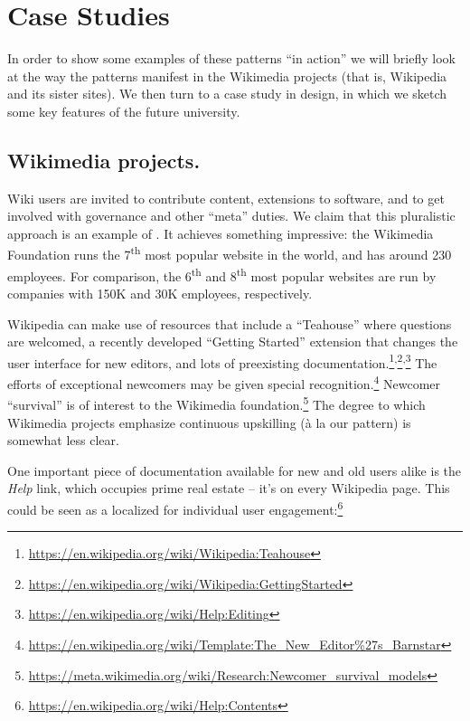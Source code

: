 \section{Case Studies}\label{sec:Case Studies}

In order to show some examples of these patterns ``in action'' we will
briefly look at the way the patterns manifest in the Wikimedia
projects (that is, Wikipedia and its sister sites).  We then turn to a
case study in design, in which we sketch some key features of the
future university.

\subsection{Wikimedia projects.}

Wiki users are invited to contribute content, extensions to software,
and to get involved with governance and other ``meta'' duties.  We
claim that this pluralistic approach is an example of
.  It achieves something
impressive: the Wikimedia Foundation runs the 7\textsuperscript{th}
most popular website in the world, and has around 230 employees.  For
comparison, the 6\textsuperscript{th} and 8\textsuperscript{th} most
popular websites are run by companies with 150K and 30K employees,
respectively.

Wikipedia  can make use of resources that
include a ``Teahouse'' where questions are welcomed, a recently
developed ``Getting Started'' extension that changes the user
interface for new editors, and lots of preexisting
documentation.\footnote{\url{https://en.wikipedia.org/wiki/Wikipedia:Teahouse}}\textsuperscript{,}\footnote{\url{https://en.wikipedia.org/wiki/Wikipedia:GettingStarted}}\textsuperscript{,}\footnote{\url{https://en.wikipedia.org/wiki/Help:Editing}}
The efforts of exceptional newcomers may be given special
recognition.\footnote{\url{https://en.wikipedia.org/wiki/Template:The_New_Editor\%27s_Barnstar}}
Newcomer ``survival'' is of interest to the Wikimedia
foundation.\footnote{\url{https://meta.wikimedia.org/wiki/Research:Newcomer_survival_models}}
The degree to which Wikimedia projects emphasize continuous upskilling
(\`a la our  pattern) is somewhat less clear.

One important piece of documentation available for new and old users
alike is the \emph{Help} link, which occupies prime real estate --
it's on every Wikipedia page.  This could be seen as a localized
 for individual user
engagement:\footnote{\url{https://en.wikipedia.org/wiki/Help:Contents}}


